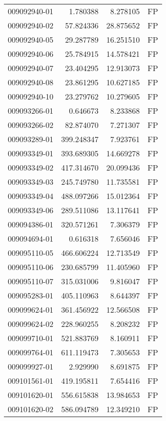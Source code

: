 \begin{tabular}{lrrl}
009092940-01 &    1.780388 &     8.278105 &   FP \\
009092940-02 &   57.824336 &    28.875652 &   FP \\
009092940-05 &   29.287789 &    16.251510 &   FP \\
009092940-06 &   25.784915 &    14.578421 &   FP \\
009092940-07 &   23.404295 &    12.913073 &   FP \\
009092940-08 &   23.861295 &    10.627185 &   FP \\
009092940-10 &   23.279762 &    10.279605 &   FP \\
009093266-01 &    0.646673 &     8.233868 &   FP \\
009093266-02 &   82.874070 &     7.271307 &   FP \\
009093289-01 &  399.248347 &     7.923761 &   FP \\
009093349-01 &  393.689305 &    14.669278 &   FP \\
009093349-02 &  417.314670 &    20.099436 &   FP \\
009093349-03 &  245.749780 &    11.735581 &   FP \\
009093349-04 &  488.097266 &    15.012364 &   FP \\
009093349-06 &  289.511086 &    13.117641 &   FP \\
009094386-01 &  320.571261 &     7.306379 &   FP \\
009094694-01 &    0.616318 &     7.656046 &   FP \\
009095110-05 &  466.606224 &    12.713549 &   FP \\
009095110-06 &  230.685799 &    11.405960 &   FP \\
009095110-07 &  315.031006 &     9.816047 &   FP \\
009095283-01 &  405.110963 &     8.644397 &   FP \\
009099624-01 &  361.456922 &    12.566508 &   FP \\
009099624-02 &  228.960255 &     8.208232 &   FP \\
009099710-01 &  521.883769 &     8.160911 &   FP \\
009099764-01 &  611.119473 &     7.305653 &   FP \\
009099927-01 &    2.929990 &     8.691875 &   FP \\
009101561-01 &  419.195811 &     7.654416 &   FP \\
009101620-01 &  556.615838 &    13.984653 &   FP \\
009101620-02 &  586.094789 &    12.349210 &   FP \\

\end{tabular}
